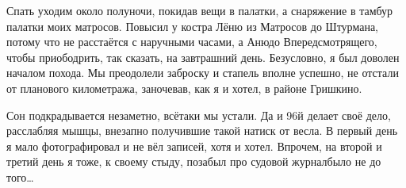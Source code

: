 Спать уходим около полуночи, покидав вещи в палатки, а снаряжение в тамбур палатки моих матросов. Повысил у костра Лёню из Матросов до Штурмана, потому что не расстаётся с наручными часами, а Аню\mdash до Впередсмотрящего, чтобы приободрить, так сказать, на завтрашний день. Безусловно, я был доволен началом похода. Мы преодолели заброску и стапель вполне успешно, не отстали от планового километража, заночевав, как я и хотел, в районе Гришкино.

Сон подкрадывается незаметно, всё\sdash таки мы устали. Да и 96\sdash й делает своё дело, расслабляя мышцы, внезапно получившие такой натиск от весла. В первый день я мало фотографировал и не вёл записей, хотя и хотел. Впрочем, на второй и третий день я тоже, к своему стыду, позабыл про судовой журнал\mdash было не до того\ldots~

\begin{center}
\end{center}